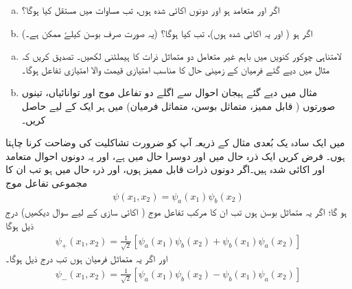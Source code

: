 \begin{enumerate}[a.]
\item
اگر  اور  متعامد ہو اور دونوں اکائی شدہ ہوں، تب مساوات  میں مستقل  کیا ہوگا؟ 
\item
اگر  ہو ( اور یہ اکائی شدہ ہوں)، تب  کیا ہوگا؟ (یہ صورت صرف بوسن کیلۓ ممکن ہے۔)
\end{enumerate}
\begin{enumerate}[a.]
\item
لامتناہی چوکور کنویں میں باہم غیر متعامل دو متماثل ذرات کا ہیملٹنی لکھیں۔ تصدیق کریں کہ مثال  میں دیے گئے فرمیان کے زمینی حال  کا مناسب امتیازی قیمت والا امتیازی تفاعل ہوگا۔ 
\item
مثال  میں دیے گئے ہیجان احوال سے اگلے دو تفاعل موج اور توانائیاں، تینوں صورتوں ( قابل ممیز، متماثل بوسن، متماثل فرمیان) میں ہر ایک کے لیے حاصل کریں۔
\end{enumerate}


میں ایک سادہ یک بُعدی مثال کے ذریعہ آپ کو ضرورت تشاکلیت کی وضاحت کرنا چاہتا ہوں۔ فرض کریں ایک ذرہ حال  میں اور دوسرا حال  میں ہے، اور یہ دونوں احوال متعامد اور اکائی شدہ ہیں۔اگر دونوں ذرات قابل ممیز ہوں، اور ذرہ  حال  میں ہو تب ان کا مجموعی تفاعل موج
\begin{align}\label{مساوات_متماثل_مجموعی_تفاعل_موج_قابل_ممیز}
	\psi(x_1, x_2)=\psi_a(x_1)\psi_b(x_2)
\end{align}
ہو گا؛ اگر یہ متماثل بوسن ہوں تب ان کا مرکب تفاعل موج ( اکائی سازی کے لیے سوال  دیکھیں) درج ذیل ہوگا
\begin{align}\label{مساوات_متماثل_مجموعی_تفاعل_موج_متماثل_بوسن}
	\psi_+(x_1, x_2) = \frac{1}{\sqrt{2}}[\psi_a(x_1)\psi_b(x_2)+\psi_b(x_1)\psi_a(x_2)]
\end{align}
اور اگر یہ متماثل فرمیان ہوں تب درج ذیل ہوگا۔
\begin{align}\label{مساوات_متماثل_مجموعی_تفاعل_موج_متماثل_فرمیان}
	\psi_-(x_1, x_2)=\frac{1}{\sqrt{2}}[\psi_a(x_1)\psi_b(x_2)-\psi_b(x_1)\psi_a(x_2)]
\end{align}

